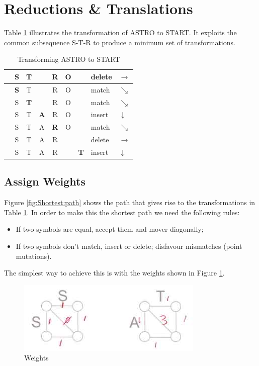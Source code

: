 \documentclass[]{article}
\begin{document}
\section{Reductions \& Translations}

Table \ref{table:transform} illustrates the transformation of ASTRO to START. It exploits the common subsequence S-T-R to produce a minimum set of transformations.
\begin{table}[H]
	\begin{center}
		\caption{Transforming ASTRO to START}\label{table:transform}
		\begin{tabular}{|c|c|c|c|c|c|c|l|l|} \hline
			\textbf{\cancel{A}}&S&T&&R&O&&delete&$\rightarrow$\\\hline
			&\textbf{S}&T&&R&O&&match&$\searrow$\\\hline
			&S&\textbf{T}&&R&O&&match&$\searrow$\\\hline
			&S&T&\textbf{A}&R&O&&insert&$\downarrow$\\\hline
			&S&T&A&\textbf{R}&O&&match&$\searrow$\\\hline
			&S&T&A&R&\textbf{\cancel{O}}&&delete&$\rightarrow$\\\hline
			&S&T&A&R&&\textbf{T}&insert&$\downarrow$\\\hline
		\end{tabular}
	\end{center}
\end{table}

\subsection{Assign Weights}

Figure \ref{fig:Shortest:path} shows the path that gives rise to the transformations in Table \ref{table:transform}. In order to make this the shortest path we need the following rules:
\begin{itemize}
	\item If two symbols are equal, accept them and mover diagonally;
	\item If two symbols don't match, insert or delete; disfavour mismatches (point mutations). 
\end{itemize}

The simplest way to achieve this is with the weights shown in Figure \ref{fig:weights}.
\begin{figure}[H]
	\begin{center}
		\caption{Weights}\label{fig:weights}
		\includegraphics[width=\textwidth]{q2-weights}
	\end{center}
\end{figure}
\end{document}

